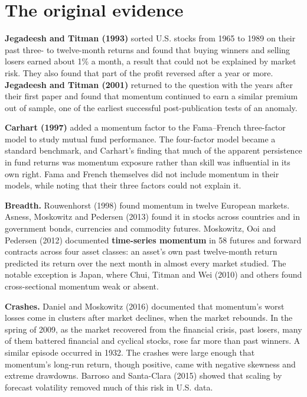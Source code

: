 \section{The original evidence}
\label{sec:09-evidence}

\textbf{Jegadeesh and Titman (1993)} sorted U.S. stocks from 1965 to 1989 on their past three- to twelve-month returns and found that buying winners and selling losers earned about 1\% a month, a result that could not be explained by market risk. They also found that part of the profit reversed after a year or more. \textbf{Jegadeesh and Titman (2001)} returned to the question with the years after their first paper and found that momentum continued to earn a similar premium out of sample, one of the earliest successful post-publication tests of an anomaly.

\textbf{Carhart (1997)} added a momentum factor to the Fama--French three-factor model to study mutual fund performance. The four-factor model became a standard benchmark, and Carhart's finding that much of the apparent persistence in fund returns was momentum exposure rather than skill was influential in its own right. Fama and French themselves did not include momentum in their models, while noting that their three factors could not explain it.

\textbf{Breadth.} Rouwenhorst (1998) found momentum in twelve European markets. Asness, Moskowitz and Pedersen (2013) found it in stocks across countries and in government bonds, currencies and commodity futures. Moskowitz, Ooi and Pedersen (2012) documented \textbf{time-series momentum} in 58 futures and forward contracts across four asset classes: an asset's own past twelve-month return predicted its return over the next month in almost every market studied. The notable exception is Japan, where Chui, Titman and Wei (2010) and others found cross-sectional momentum weak or absent.

\textbf{Crashes.} Daniel and Moskowitz (2016) documented that momentum's worst losses come in clusters after market declines, when the market rebounds. In the spring of 2009, as the market recovered from the financial crisis, past losers, many of them battered financial and cyclical stocks, rose far more than past winners. A similar episode occurred in 1932. The crashes were large enough that momentum's long-run return, though positive, came with negative skewness and extreme drawdowns. Barroso and Santa-Clara (2015) showed that scaling by forecast volatility removed much of this risk in U.S. data.

